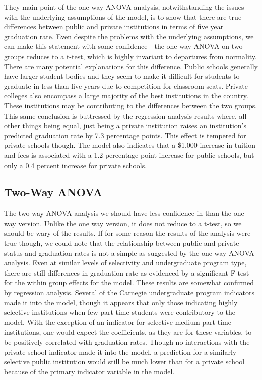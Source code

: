 \documentclass{article}
\begin{document}
They main point of the one-way ANOVA analysis, notwithstanding the issues with the underlying assumptions of the model, is to show that there are true differences between public and private institutions in terms of five year graduation rate. Even despite the problems with the underlying assumptions, we can make this statement with some confidence - the one-way ANOVA on two groups reduces to a t-test, which is highly invariant to departures from normality. There are many potential explanations for this difference. Public schools generally have larger student bodies and they seem to make it difficult for students to graduate in less than five years due to competition for classroom seats. Private colleges also encompass a large majority of the best institutions in the country. These institutions may be contributing to the differences between the two groups. This same conclusion is buttressed by the regression analysis results where, all other things being equal, just being a private institution raises an institution's predicted graduation rate by 7.3 percentage points. This effect is tempered for private schools though. The model also indicates that a \$1,000 increase in tuition and fees is associated with a 1.2 percentage point increase for public schools, but only a 0.4 percent increase for private schools.

\subsection{Two-Way ANOVA}

The two-way ANOVA analysis we should have less confidence in than the one-way version. Unlike the one way version, it does not reduce to a t-test, so we should be wary of the results. If for some reason the results of the analysis were true though, we could note that the relationship between public and private status and graduation rates is not a simple as suggested by the one-way ANOVA analysis. Even at similar levels of selectivity and undergraduate program type, there are still differences in graduation rate as evidenced by a significant F-test for the within group effects for the model. These results are somewhat confirmed by regression analysis. Several of the Carnegie undergraduate program indicators made it into the model, though it appears that only those indicating highly selective institutions when few part-time students were contributory to the model. With the exception of an indicator for selective medium part-time institutions, one would expect the coefficients, as they are for these variables, to be positively correlated with graduation rates. Though no interactions with the private school indicator made it into the model, a prediction for a similarly selective public institution would still be much lower than for a private school because of the primary indicator variable in the model.
\end{document}
